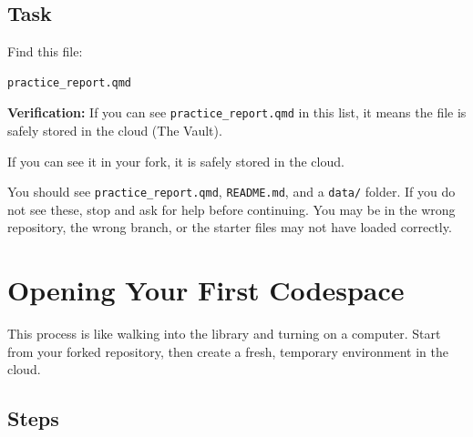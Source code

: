 \documentclass[
  letterpaper,
  DIV=11,
  numbers=noendperiod,
  oneside]{scrreprt}
\begin{document}
\section{Task}\label{task-1}

Find this file:

\begin{verbatim}
practice_report.qmd
\end{verbatim}

\textbf{Verification:} If you can see \texttt{practice\_report.qmd} in
this list, it means the file is safely stored in the cloud (The Vault).

If you can see it in your fork, it is safely stored in the cloud.

You should see \texttt{practice\_report.qmd}, \texttt{README.md}, and a
\texttt{data/} folder. If you do not see these, stop and ask for help
before continuing. You may be in the wrong repository, the wrong branch,
or the starter files may not have loaded correctly.

\chapter{Opening Your First
Codespace}\label{opening-your-first-codespace}

This process is like walking into the library and turning on a computer.
Start from your forked repository, then create a fresh, temporary
environment in the cloud.

\section{Steps}\label{steps}
\end{document}
